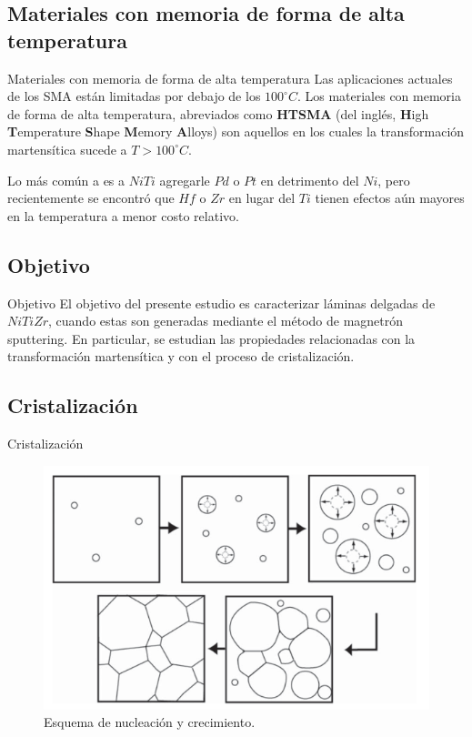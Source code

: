 \documentclass[11pt]{beamer}
\begin{document}
	\subsection{Materiales con memoria de forma de alta temperatura}
		\begin{frame}{Materiales con memoria de forma de alta temperatura}
			Las aplicaciones actuales de los SMA están limitadas por debajo de los $100^\circ C$. Los materiales con memoria de forma de alta temperatura, abreviados como \textbf{HTSMA} (del inglés, \textbf{H}igh \textbf{T}emperature \textbf{S}hape \textbf{M}emory \textbf{A}lloys) son aquellos en los cuales la transformación martensítica sucede a $T > 100^\circ C$.
			
			Lo más común a es a $NiTi$ agregarle $Pd$ o $Pt$ en detrimento del $Ni$, pero recientemente se encontró que $Hf$ o $Zr$ en lugar del $Ti$ tienen efectos aún mayores en la temperatura a menor costo relativo.
		\end{frame}
		
	\subsection{Objetivo}
		\begin{frame}{Objetivo}
			El objetivo del presente estudio es caracterizar láminas delgadas de $NiTiZr$, cuando estas son generadas mediante el método de magnetrón sputtering. En particular, se estudian las propiedades relacionadas con la transformación martensítica y con el proceso de cristalización.
		\end{frame}
		
	\subsection{Cristalización}
		\begin{frame}{Cristalización}
			\begin{figure}
				\includegraphics[scale=0.35]{img/cristalization.png}
				\caption*{Esquema de nucleación y crecimiento.}
			\end{figure}
		\end{frame}
		
\end{document}
